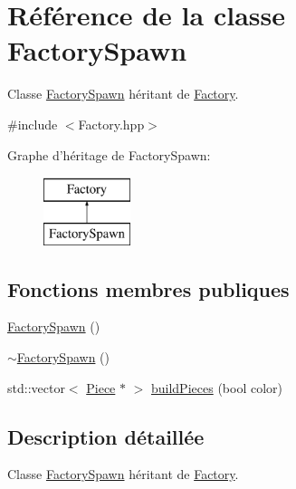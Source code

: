 \hypertarget{class_factory_spawn}{\section{Référence de la classe Factory\-Spawn}
\label{class_factory_spawn}
}


Classe \hyperlink{class_factory_spawn}{Factory\-Spawn} héritant de \hyperlink{class_factory}{Factory}.  




{\ttfamily \#include $<$Factory.\-hpp$>$}

Graphe d'héritage de Factory\-Spawn\-:\begin{figure}[H]
\begin{center}
\leavevmode
\includegraphics[height=2.000000cm]{class_factory_spawn}
\end{center}
\end{figure}
\subsection*{Fonctions membres publiques}
\begin{DoxyCompactItemize}
\item 
\hyperlink{class_factory_spawn_afa2ea203f016dc06217ab48607c4e899}{Factory\-Spawn} ()
\item 
\hyperlink{class_factory_spawn_ae7ec52abd4b3dc1e49cd9988a1d1d9bc}{$\sim$\-Factory\-Spawn} ()
\item 
std\-::vector$<$ \hyperlink{class_piece}{Piece} $\ast$ $>$ \hyperlink{class_factory_spawn_acdae41c4747246f35de741b32b3f74ac}{build\-Pieces} (bool color)
\end{DoxyCompactItemize}


\subsection{Description détaillée}
Classe \hyperlink{class_factory_spawn}{Factory\-Spawn} héritant de \hyperlink{class_factory}{Factory}. 

